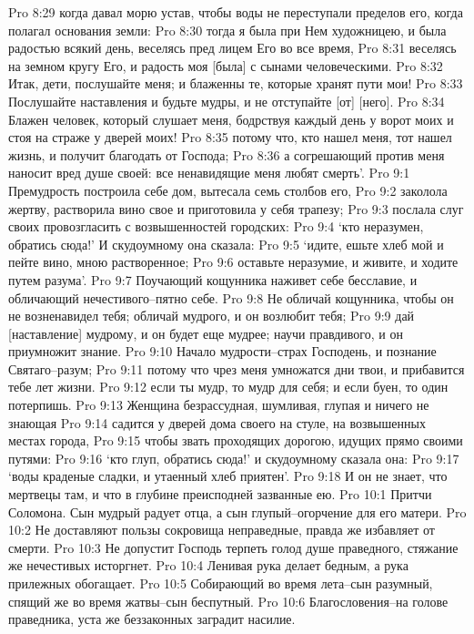 Pro 8:29  когда давал морю устав, чтобы воды не переступали пределов его, когда полагал основания земли:
Pro 8:30  тогда я была при Нем художницею, и была радостью всякий день, веселясь пред лицем Его во все время,
Pro 8:31  веселясь на земном кругу Его, и радость моя [была] с сынами человеческими.
Pro 8:32  Итак, дети, послушайте меня; и блаженны те, которые хранят пути мои!
Pro 8:33  Послушайте наставления и будьте мудры, и не отступайте [от] [него].
Pro 8:34  Блажен человек, который слушает меня, бодрствуя каждый день у ворот моих и стоя на страже у дверей моих!
Pro 8:35  потому что, кто нашел меня, тот нашел жизнь, и получит благодать от Господа;
Pro 8:36  а согрешающий против меня наносит вред душе своей: все ненавидящие меня любят смерть'.
Pro 9:1  Премудрость построила себе дом, вытесала семь столбов его,
Pro 9:2  заколола жертву, растворила вино свое и приготовила у себя трапезу;
Pro 9:3  послала слуг своих провозгласить с возвышенностей городских:
Pro 9:4  `кто неразумен, обратись сюда!' И скудоумному она сказала:
Pro 9:5  `идите, ешьте хлеб мой и пейте вино, мною растворенное;
Pro 9:6  оставьте неразумие, и живите, и ходите путем разума'.
Pro 9:7  Поучающий кощунника наживет себе бесславие, и обличающий нечестивого--пятно себе.
Pro 9:8  Не обличай кощунника, чтобы он не возненавидел тебя; обличай мудрого, и он возлюбит тебя;
Pro 9:9  дай [наставление] мудрому, и он будет еще мудрее; научи правдивого, и он приумножит знание.
Pro 9:10  Начало мудрости--страх Господень, и познание Святаго--разум;
Pro 9:11  потому что чрез меня умножатся дни твои, и прибавится тебе лет жизни.
Pro 9:12  если ты мудр, то мудр для себя; и если буен, то один потерпишь.
Pro 9:13  Женщина безрассудная, шумливая, глупая и ничего не знающая
Pro 9:14  садится у дверей дома своего на стуле, на возвышенных местах города,
Pro 9:15  чтобы звать проходящих дорогою, идущих прямо своими путями:
Pro 9:16  `кто глуп, обратись сюда!' и скудоумному сказала она:
Pro 9:17  `воды краденые сладки, и утаенный хлеб приятен'.
Pro 9:18  И он не знает, что мертвецы там, и что в глубине преисподней зазванные ею.
Pro 10:1  Притчи Соломона. Сын мудрый радует отца, а сын глупый--огорчение для его матери.
Pro 10:2  Не доставляют пользы сокровища неправедные, правда же избавляет от смерти.
Pro 10:3  Не допустит Господь терпеть голод душе праведного, стяжание же нечестивых исторгнет.
Pro 10:4  Ленивая рука делает бедным, а рука прилежных обогащает.
Pro 10:5  Собирающий во время лета--сын разумный, спящий же во время жатвы--сын беспутный.
Pro 10:6  Благословения--на голове праведника, уста же беззаконных заградит насилие.
